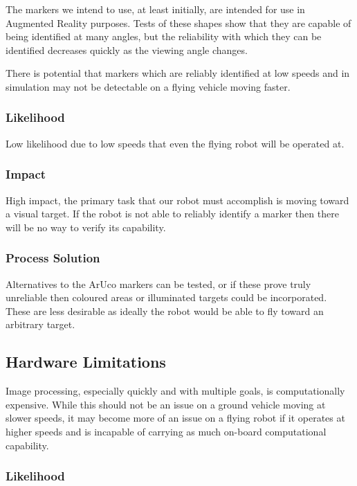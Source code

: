 \documentclass{article}
\begin{document}
	The markers we intend to use, at least initially, are intended for use in Augmented Reality purposes. Tests of these shapes show that they are capable of being identified at many angles, but the reliability with which they can be identified decreases quickly as the viewing angle changes. 
	
	There is potential that markers which are reliably identified at low speeds and in simulation may not be detectable on a flying vehicle moving faster.
	
		\subsubsection{Likelihood}
		
		Low likelihood due to low speeds that even the flying robot will be operated at.
		
		\subsubsection{Impact}
		
		High impact, the primary task that our robot must accomplish is moving toward a visual target. If the robot is not able to reliably identify a marker then there will be no way to verify its capability.
		
		\subsubsection{Process Solution}
		
		Alternatives to the ArUco markers can be tested, or if these prove truly unreliable then coloured areas or illuminated targets could be incorporated. These are less desirable as ideally the robot would be able to fly toward an arbitrary target.
		
	\subsection{Hardware Limitations}
	
	Image processing, especially quickly and with multiple goals, is computationally expensive. While this should not be an issue on a ground vehicle moving at slower speeds, it may become more of an issue on a flying robot if it operates at higher speeds and is incapable of carrying as much on-board computational capability.
	
		\subsubsection{Likelihood}
		
\end{document}
